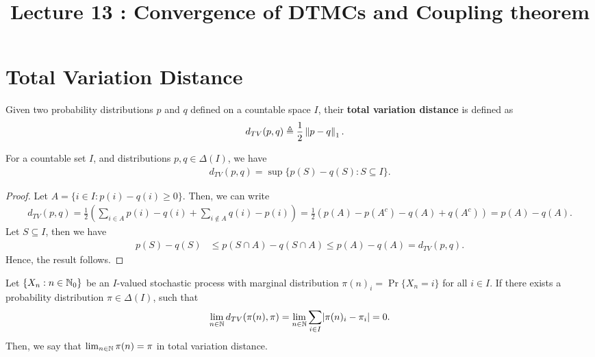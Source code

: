 \documentclass[a4paper,10pt,english]{article}
\title{Lecture 13 : Convergence of DTMCs and Coupling theorem}
\author{}
\begin{document}
\maketitle

\section{Total Variation Distance}
\begin{defn} Given two probability distributions $p$ and $q$ defined on a countable space $I$, their \textbf{total variation distance} is defined as
\begin{align*}
d_{TV}(p,q) &\triangleq \dfrac{1}{2}\left\lVert p-q\right\rVert_1.
\end{align*}
\end{defn}
\begin{lem} For a countable set $I$, and distributions $p, q \in \Delta(I)$, we have 
\begin{align*}
d_{TV}(p,q) = \sup\{ p(S) - q(S) : S \subseteq I \}.
\end{align*}
\end{lem}
\begin{proof} 
Let $A = \{ i \in I: p(i) - q(i) \geq 0\}$. Then, we can write
\begin{align*}
d_{TV}(p,q) = \frac{1}{2}\left(\sum_{i \in A}p(i) - q(i) + \sum_{i \notin A} q(i) - p(i) \right)= \frac{1}{2}\left(p(A) - p(A^c) - q(A) + q(A^c) \right) = p(A)-q(A).
\end{align*}
Let $S \subseteq I$, then we have
\begin{align*}
p(S)-q(S) &\leq p(S\cap A) - q(S \cap A) \leq p(A) - q(A) = d_{TV}(p,q).
\end{align*}
Hence, the result follows.
\end{proof}
\begin{defn} Let $\{X_n : n \in \mathbb{N}_0\}$ be an $I$-valued stochastic process with marginal distribution $\pi(n)_i = \Pr\{X_n = i\}$ for all $i \in I$. 
If  there exists a probability distribution $\pi \in \Delta(I)$, such that 
\begin{align*}
\lim_{n \in \mathbb{N}} d_{TV}(\pi(n), \pi) = \lim_{n \in \mathbb{N}} \sum_{i \in I} \lvert\pi(n)_i - \pi_i\rvert = 0.
\end{align*}
Then, we say that $\lim_{n \in \mathbb{N}}\pi(n) = \pi$ in total variation distance.
\end{defn}
\end{document}
